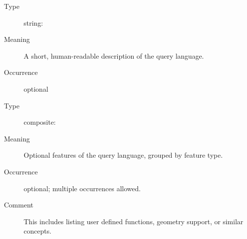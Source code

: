 \documentclass{ivoa}
\begin{document}
\begin{generated}
\begin{bigdescription}
\begin{description}
\end{description}
\item[Element \xmlel{description}]
\begin{description}
\item[Type] string: 
\item[Meaning] A short, human-readable description of the
          query language.
\item[Occurrence] optional

\end{description}
\item[Element \xmlel{languageFeatures}]
\begin{description}
\item[Type] composite: 
\item[Meaning] Optional features of the query language, grouped by
            feature type.
\item[Occurrence] optional; multiple occurrences allowed.
\item[Comment] This includes listing user defined functions, geometry support,
            or similar concepts.

\end{description}


\end{bigdescription}\endgroup

\endgroup
\end{generated}

\end{document}
